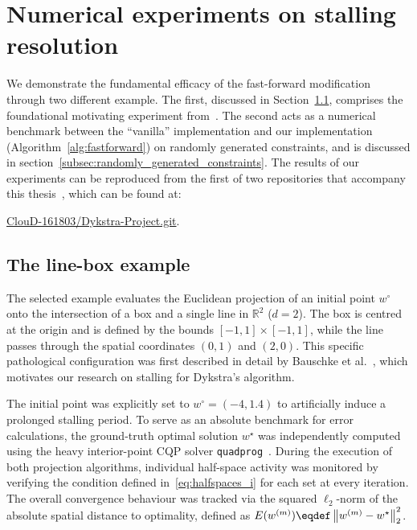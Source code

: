 \section{Numerical experiments on stalling resolution} \label{sec:dykstra_numerical_experiments}

We demonstrate the fundamental efficacy of the fast-forward modification through two different example. The first, discussed in Section~\ref{subsec:line_box_example}, comprises the foundational motivating experiment from~\cite{DYKSTRASTALLING}. The second acts as a numerical benchmark between the ``vanilla'' implementation and our implementation (Algorithm~\ref{alg:fastforward}) on randomly generated constraints, and is discussed in section~\ref{subsec:randomly_generated_constraints}. The results of our experiments can be reproduced from the first of two repositories that accompany this thesis~\cite{DykstraProjectRepo, DykstraOptimalTransportRepo}, which can be found at:

\begin{center}
    \href{https://github.com/ClouD-161803/Senior-Thesis-4YPe.git}{ClouD-161803/Dykstra-Project.git}.
\end{center}

\subsection{The line-box example} \label{subsec:line_box_example}

 The selected example evaluates the Euclidean projection of an initial point $w^\circ$ onto the intersection of a box and a single line in $\mathbb{R}^2$ ($d=2$). The box is centred at the origin and is defined by the bounds $ [-1, 1] \times [-1, 1]$, while the line passes through the spatial coordinates $(0,1)$ and $(2, 0)$. This specific pathological configuration was first described in detail by Bauschke et al.~\cite{DYKSTRASTALLING}, which motivates our research on stalling for Dykstra's algorithm. 

The initial point was explicitly set to $w^\circ = (-4, 1.4)$ to artificially induce a prolonged stalling period. To serve as an absolute benchmark for error calculations, the ground-truth optimal solution $w^\star$ was independently computed using the heavy interior-point CQP solver \texttt{quadprog}~\cite{goldfarb1983quadprog, turlach2019quadprog}. During the execution of both projection algorithms, individual half-space activity was monitored by verifying the condition defined in~\eqref{eq:halfspaces_i} for each set at every iteration. The overall convergence behaviour was tracked via the squared $\ell_2$-norm of the absolute spatial distance to optimality, defined as $E(w^{(m)}) \eqdef \twonorm{w^{(m)} - w^\star}^2$.

